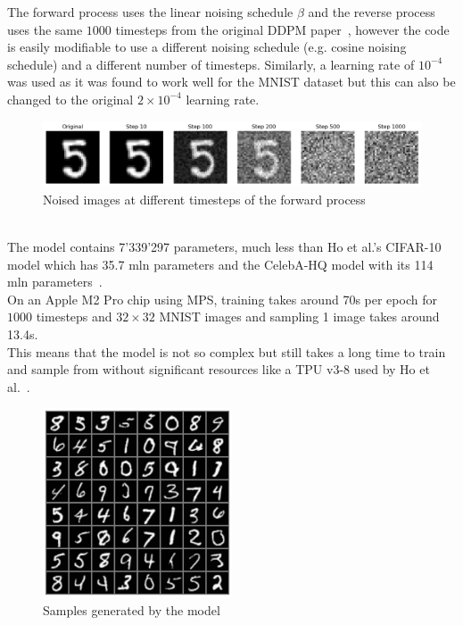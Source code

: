 \documentclass[twoside]{article}
\numberwithin{equation}{section}
\numberwithin{figure}{section}
\begin{document}
The forward process uses the linear noising schedule $\beta$ and the reverse process uses the same $1000$ timesteps from the original DDPM paper~\cite{ho2020denoising}, however the code is easily modifiable to use a different noising schedule (e.g. cosine noising schedule) and a different number of timesteps. Similarly, a learning rate of $10^{-4}$ was used as it was found to work well for the MNIST dataset but this can also be changed to the original $2 \times 10^{-4}$ learning rate.
\begin{figure}[h]
  \begin{center}
    \includegraphics[width=\textwidth]{images/forward.png}
    \caption{Noised images at different timesteps of the forward process}
  \end{center}
\end{figure}
\\
The model contains 7'339'297 parameters, much less than Ho et al.'s CIFAR-10 model which has 35.7 mln parameters and the CelebA-HQ model with its 114 mln parameters~\cite{ho2020denoising}. \\
On an Apple M2 Pro chip using MPS, training takes around 70s per epoch for $1000$ timesteps and $32 \times 32$ MNIST images and sampling 1 image takes around 13.4s. \\
This means that the model is not so complex but still takes a long time to train and sample from without significant resources like a TPU v3-8 used by Ho et al.~\cite{ho2020denoising}. 
\newpage
\begin{figure}[h]
  \begin{center}
    \includegraphics[width=0.5\textwidth]{images/sample.png}
    \caption{Samples generated by the model}
  \end{center}
\end{figure}
\end{document}
